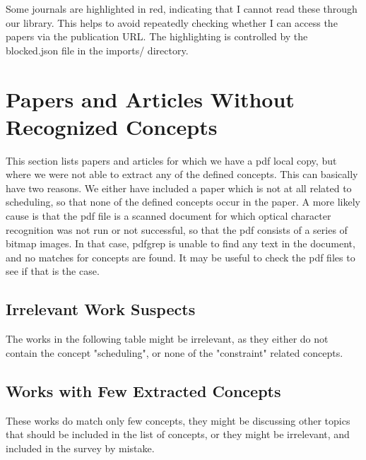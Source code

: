 \documentclass[a4paper]{article}
\begin{document}
Some journals are highlighted in red, indicating that I cannot read these through our library. This helps to avoid repeatedly checking whether I can access the papers via the publication URL. The highlighting is controlled by the blocked.json file in the imports/ directory.





\clearpage
\section{Papers and Articles Without Recognized Concepts}

This section lists papers and articles for which we have a pdf local copy, but where we were not able to extract any of the defined concepts. This can basically have two reasons. We either have included a paper which is not at all related to scheduling, so that none of the defined concepts occur in the paper. A  more likely cause is that the pdf file is a scanned document for which optical character recognition was not run or not successful, so that the pdf consists of a series of bitmap images. In that case, pdfgrep is unable to find any text in the document, and no matches for concepts are found. It may be useful to check the pdf files to see if that is the case.





\subsection{Irrelevant Work Suspects}
The works in the following table might be irrelevant, as they either do not contain the concept "scheduling", or none of the "constraint" related concepts.




\subsection{Works with Few Extracted Concepts}

These works do match only few concepts, they might be discussing other topics that should be included in the list of concepts, or they might be irrelevant, and included in the survey by mistake.



\end{document}
